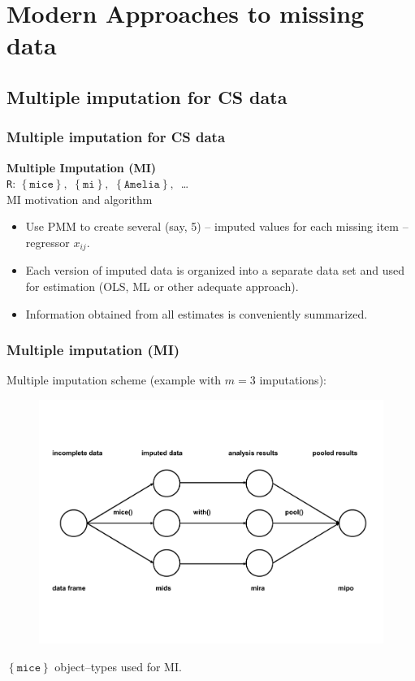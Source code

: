 \documentclass{beamer}
\begin{document}
\section{Modern Approaches to missing data}
\subsection{Multiple imputation for CS data}
\begin{frame}
\frametitle{Multiple imputation  for CS data}
\textbf{Multiple Imputation (MI) }\\
\texttt{R}: $\left\lbrace \texttt{mice}  \right\rbrace , \,\, \left\lbrace \texttt{mi}  \right\rbrace, \,\, \left\lbrace \texttt{Amelia}  \right\rbrace, \, $ \dots\\
  \vspace{0.5cm}
MI motivation and algorithm\\
  \vspace{0.2cm}
  \begin{itemize}
  \item Use PMM to create several  (say, 5) -- imputed values for each missing item -- regressor $x_{ij}$.
  \medskip
  \item Each version of imputed data is organized into a separate data set and used for estimation (OLS, ML or other adequate approach).
  \medskip
  \item Information obtained from all estimates is conveniently summarized.
 \end{itemize}
 \end{frame}
\begin{frame}
\frametitle{Multiple imputation (MI)}
Multiple imputation scheme (example with $m=3$ imputations):\\
\vspace{-1cm}
\begin{figure}
\includegraphics[width=1\linewidth]{IMG/mice_scheme.pdf}
\end{figure}
\centering
\vspace{-2.2cm}
$\left\lbrace \texttt{mice}  \right\rbrace$ object--types used for MI.
 \end{frame}
\end{document}
